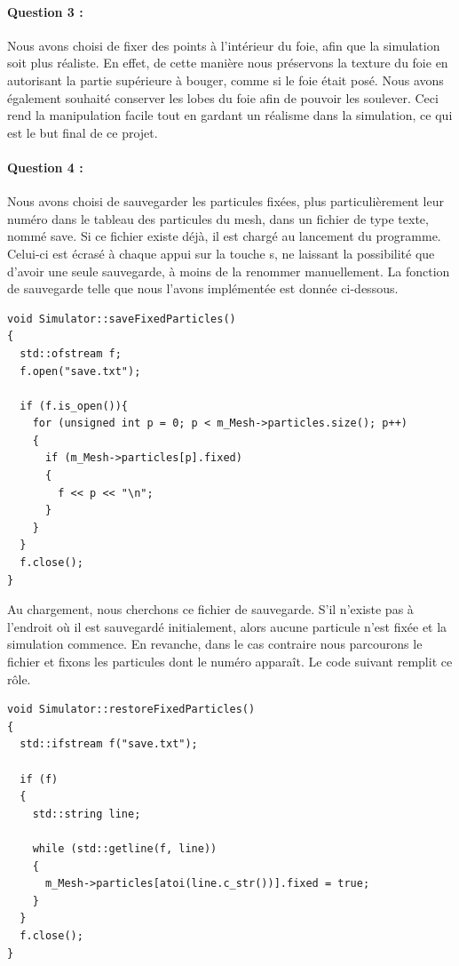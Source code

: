 \documentclass[a4paper,12pt]{article}
\begin{document}
\paragraph{Question 3 :} Nous avons choisi de fixer des points à l'intérieur du foie, afin que la simulation soit plus réaliste. En effet, de cette manière nous préservons la \og{}texture\fg{} du foie en autorisant la partie supérieure à bouger, comme si le foie était posé. Nous avons également souhaité conserver les lobes du foie afin de pouvoir les soulever. Ceci rend la manipulation facile tout en gardant un réalisme dans la simulation, ce qui est le but final de ce projet.

\paragraph{Question 4 :} Nous avons choisi de sauvegarder les particules fixées, plus particulièrement leur numéro dans le tableau des particules du mesh, dans un fichier de type texte, nommé \og{}save\fg{}. Si ce fichier existe déjà, il est chargé au lancement du programme. Celui-ci est écrasé à chaque appui sur la touche \og{}s\fg{}, ne laissant la possibilité que d'avoir une seule sauvegarde, à moins de la renommer manuellement. La fonction de sauvegarde telle que nous l'avons implémentée est donnée ci-dessous. 
\begin{lstlisting}
void Simulator::saveFixedParticles()
{
  std::ofstream f;
  f.open("save.txt");

  if (f.is_open()){
    for (unsigned int p = 0; p < m_Mesh->particles.size(); p++)
    {
      if (m_Mesh->particles[p].fixed)
      {
        f << p << "\n";
      }
    }
  }
  f.close();
}
\end{lstlisting}

Au chargement, nous cherchons ce fichier de sauvegarde. S'il n'existe pas à l'endroit où il est sauvegardé initialement, alors aucune particule n'est fixée et la simulation commence. En revanche, dans le cas contraire nous parcourons le fichier et fixons les particules dont le numéro apparaît. Le code suivant remplit ce rôle.
\newpage\begin{lstlisting}
void Simulator::restoreFixedParticles()
{
  std::ifstream f("save.txt");

  if (f)
  {
    std::string line;

    while (std::getline(f, line))
    {
      m_Mesh->particles[atoi(line.c_str())].fixed = true;
    }
  }
  f.close();
}
\end{lstlisting}
\end{document}
